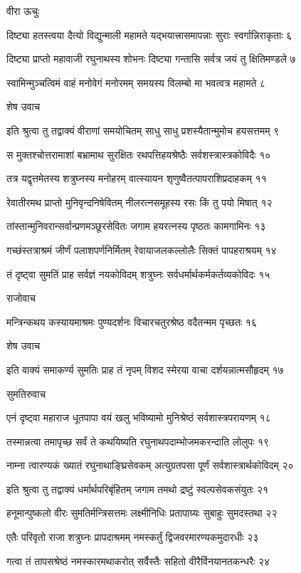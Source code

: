 वीरा ऊचुः

दिष्ट्या हतस्त्वया दैत्यो विद्युन्माली महामते
यद्भयात्त्रासमापन्नाः सुराः स्वर्गान्निराकृताः ६

दिष्ट्या प्राप्तो महावाजी रघुनाथस्य शोभनः
दिष्ट्या गन्तासि सर्वत्र जयं तु क्षितिमण्डले ७

स्वामिन्मुञ्चत्विमं वाहं मनोवेगं मनोरमम्
समयस्य विलम्बो मा भवत्वत्र महामते ८

शेष उवाच

इति श्रुत्वा तु तद्वाक्यं वीराणां समयोचितम्
साधु साधु प्रशस्यैतान्मुमोच हयसत्तमम् ९

स मुक्तश्चोत्तरामाशां बभ्रामाथ सुरक्षितः
रथपत्तिहयश्रेष्ठैः सर्वशस्त्रास्त्रकोविदैः १०

तत्र यद्वृत्तमेतस्य शत्रुघ्नस्य मनोहरम्
वात्स्यायन शृणुष्वैतत्पापराशिप्रदाहकम् ११

रेवातीरमथ प्राप्तो मुनिवृन्दनिषेवितम्
नीलरत्नसमूहस्य रसः किं तु पयो मिषात् १२

तांस्तान्मुनिवरान्सर्वान्प्रणमञ्छूरसेवितः
जगाम हयरत्नस्य पृष्ठतः कामगामिनः १३

गच्छंस्तत्राश्रमं जीर्णं पलाशपर्णनिर्मितम्
रेवायाजलकल्लोलैः सिक्तं पापहराश्रयम् १४

तं दृष्ट्वा सुमतिं प्राह सर्वज्ञं नयकोविदम्
शत्रुघ्नः सर्वधर्मार्थकर्मकर्तव्यकोविदः १५

राजोवाच

मन्त्रिन्कथय कस्यायमाश्रमः पुण्यदर्शनः
विचारचतुरश्रेष्ठ वदैतन्मम पृच्छतः १६

शेष उवाच

इति वाक्यं समाकर्ण्य सुमतिः प्राह तं नृपम्
विशद स्मेरया वाचा दर्शयन्नात्मसौहृदम् १७

सुमतिरुवाच

एनं दृष्ट्वा महाराज धूतपापा वयं खलु
भविष्यामो मुनिश्रेष्ठं सर्वशास्त्रपरायणम् १८

तस्मान्नत्वा तमापृच्छ सर्वं ते कथयिष्यति
रघुनाथपदाम्भोजमकरन्दाति लोलुपः १९

नाम्ना त्वारण्यकं ख्यातं रघुनाथाङ्घ्रिसेवकम्
अत्युग्रतपसा पूर्णं सर्वशास्त्रार्थकोविदम् २०

इति श्रुत्वा तु तद्वाक्यं धर्मार्थपरिबृंहितम्
जगाम तमथो द्रष्टुं स्वल्पसेवकसंयुतः २१

हनूमान्पुष्कलो वीरः सुमतिर्मन्त्रिसत्तमः
लक्ष्मीनिधिः प्रतापाग्र्यः सुबाहुः सुमदस्तथा २२

एतैः परिवृतो राजा शत्रुघ्नः प्रापदाश्रमम्
नमस्कर्तुं द्विजवरमारण्यकमुदारधीः २३

गत्वा तं तापसश्रेष्ठं नमस्कारमथाकरोत्
सर्वैस्तैः सहितो वीरैर्विनयानतकन्धरैः २४

